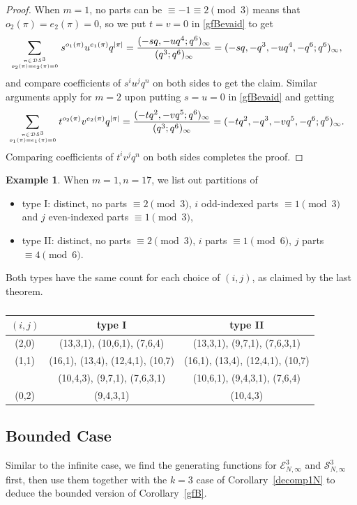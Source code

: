 \documentclass[12pt]{amsart}
\numberwithin{equation}{section}
\theoremstyle{plain}
\theoremstyle{definition}
\newtheorem{example}[theorem]{Example}
\begin{document}
\begin{proof}
When $m=1$, no parts can be $\equiv -1\equiv 2 \pmod 3$ means that $o_2(\pi)=e_2(\pi)=0$, so we put $t=v=0$ in \eqref{gfBevaid} to get 
\begin{align}
\label{t=v=0}
\sum\limits_{\pi\in\mathcal{DS}^3 \atop o_2(\pi)=e_2(\pi)=0}s^{o_1(\pi)}u^{e_1(\pi)}q^{|\pi|}&=\dfrac{(-sq,-uq^4;q^6)_{\infty}}{(q^3;q^6)_{\infty}}=(-sq,-q^3,-uq^4,-q^6;q^6)_{\infty},
\end{align}
and compare coefficients of $s^iu^jq^n$ on both sides to get the claim. Similar arguments apply for $m=2$ upon putting $s=u=0$ in \eqref{gfBevaid} and getting 
\begin{align}
\label{s=u=0}
\sum\limits_{\pi\in\mathcal{DS}^3 \atop o_1(\pi)=e_1(\pi)=0}t^{o_2(\pi)}v^{e_2(\pi)}q^{|\pi|}&=\dfrac{(-tq^2,-vq^5;q^6)_{\infty}}{(q^3;q^6)_{\infty}}=(-tq^2,-q^3,-vq^5,-q^6;q^6)_{\infty}.
\end{align}
Comparing coefficients of $t^iv^jq^n$ on both sides completes the proof.
\end{proof}
\begin{example}
When $m=1, n=17$, we list out partitions of 
\begin{itemize}
\item type I: distinct, no parts $\equiv 2 \pmod 3$, $i$ odd-indexed parts $\equiv 1 \pmod 3$ and $j$ even-indexed parts $\equiv 1 \pmod 3$,
\item type II: distinct, no parts $\equiv 2 \pmod 3$, $i$ parts $\equiv 1 \pmod 6$, $j$ parts $\equiv 4 \pmod 6$.
\end{itemize}
Both types have the same count for each choice of $(i,j)$, as claimed by the last theorem.
\begin{table}[htbp]\caption{}
\centering
\begin{tabular}{|c|c|c|}
\hline
$(i,j)$ & type I & type II\\
\hline
(2,0) & (13,3,1), (10,6,1), (7,6,4) & (13,3,1), (9,7,1), (7,6,3,1)\\
\hline
(1,1) & (16,1), (13,4), (12,4,1), (10,7) & (16,1), (13,4), (12,4,1), (10,7)\\
 & (10,4,3), (9,7,1), (7,6,3,1) & (10,6,1), (9,4,3,1), (7,6,4)\\
\hline
(0,2) & (9,4,3,1) & (10,4,3)\\
\hline
\end{tabular}
\label{tab1}
\end{table}
\end{example}

\subsection{Bounded Case}
Similar to the infinite case, we find the generating functions for $\mathcal{E}_{N,\infty}^3$ and $\mathcal{S}_{N,\infty}^{3}$ first, then use them together with the $k=3$ case of Corollary~\ref{decomp1N} to deduce the bounded version of Corollary~\ref{gfB}. 
\end{document}
